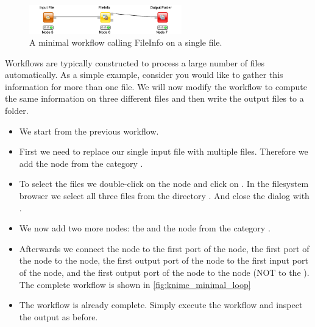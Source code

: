 \begin{figure}
\centering
\includegraphics[width=0.59\textwidth]{graphics/knime_setup/Minimal_FileInfo}
\caption{A minimal workflow calling FileInfo on a single file.}
\label{fig:knime_minimal}
\end{figure}


Workflows are typically constructed to process a large number of files automatically.
As a simple example, consider you would like to gather this information for more than one file.
We will now modify the workflow to compute the same information on three different files and then write the output files to a folder.

\begin{itemize}
\item
We start from the previous workflow.
\item
First we need to replace our single input file with multiple files.
Therefore we add the  node from the category .
\item
To select the files we double-click on the  node and click on .
In the filesystem browser we select all three files from the directory .
And close the dialog with .
\item
We now add two more nodes: the  and the  node from the category . 
\item
Afterwards we connect the  node to the first port of the  node, the first port of the  node to the  node, the first output port of the  node to the first input port of the  node, and the first output port of the  node to the  node (NOT to the ).
The complete workflow is shown in \cref{fig:knime_minimal_loop}
\item
The workflow is already complete.
Simply execute the workflow and inspect the output as before.
\end{itemize}

